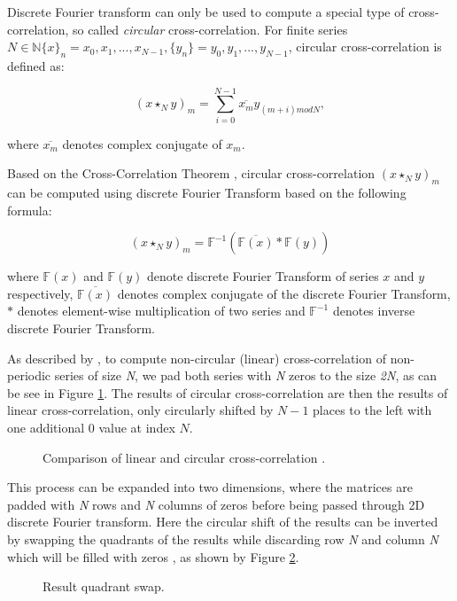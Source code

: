 Discrete Fourier transform can only be used to compute a special type of cross-correlation, so called \textit{circular} cross-correlation.
For finite series $N \in \mathbb{N} \{x\}_n = x_0, x_1, ..., x_{N-1}, \{y_n\} = y_0, y_1, ..., y_{N-1}$, circular cross-correlation is defined as:

\[
(x \star_N y)_m = \sum_{i=0}^{N-1} \overline{x_m} y_{(m + i) mod N},
\]

where $\overline{x_m}$ denotes complex conjugate of $x_m$.


Based on the Cross-Correlation Theorem \citep{thesis:wang}, circular cross-correlation $(x \star_N y)_m$ can be computed using discrete Fourier Transform based on the following formula:

\[
(x \star_N y)_m = \mathbb{F}^{-1}(\overline{\mathbb{F}(x)}*\mathbb{F}(y))
\]

where $\mathbb{F}(x)$ and $\mathbb{F}(y)$ denote discrete Fourier Transform of series $x$ and $y$ respectively, $\overline{\mathbb{F}(x)}$ denotes complex conjugate of the discrete Fourier Transform, $*$ denotes element-wise multiplication of two series and $\mathbb{F}^{-1}$ denotes inverse discrete Fourier Transform.

As described by \citet{misko}, to compute non-circular (linear) cross-correlation of non-periodic series of size \textit{N}, we pad both series with \textit{N} zeros to the size \textit{2N}, as can be see in Figure \ref{fig:circular_cross_corr}. The results of circular cross-correlation are then the results of linear cross-correlation, only circularly shifted by $N-1$ places to the left with one additional 0 value at index $N$. 

\begin{figure}[h]
	\centering
	\def\svgwidth{0.8\textwidth}
	
	\caption{Comparison of linear and circular cross-correlation \citep{misko}.}
	\label{fig:circular_cross_corr}
\end{figure}


This process can be expanded into two dimensions, where the matrices are padded with \textit{N} rows and \textit{N} columns of zeros before being passed through 2D discrete Fourier transform. Here the circular shift of the results can be inverted by swapping the quadrants of the results while discarding row \textit{N} and column \textit{N} which will be filled with zeros \citep{misko}, as shown by Figure \ref{fig:quadrant_swap}. 

\begin{figure}[h]
	\centering
	\def\svgwidth{0.8\textwidth}
	
	\caption{Result quadrant swap.}
	\label{fig:quadrant_swap}
\end{figure}


